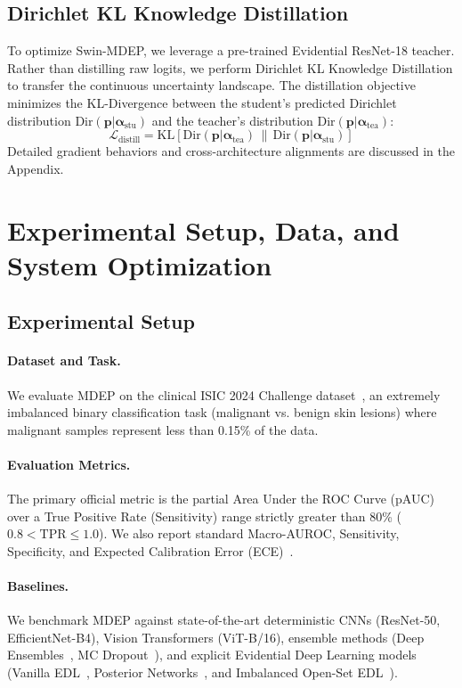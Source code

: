 \documentclass[letterpaper]{article} %
\begin{document}
\subsection{Dirichlet KL Knowledge Distillation}\label{subsec:distillation}
To optimize Swin-MDEP, we leverage a pre-trained Evidential ResNet-18 teacher. Rather than distilling raw logits, we perform Dirichlet KL Knowledge Distillation to transfer the continuous uncertainty landscape. The distillation objective minimizes the KL-Divergence between the student's predicted Dirichlet distribution $\text{Dir}(\bm{p} | \bm{\alpha}_{\text{stu}})$ and the teacher's distribution $\text{Dir}(\bm{p} | \bm{\alpha}_{\text{tea}})$:
\begin{equation}
    \mathcal{L}_{\text{distill}} = \text{KL} \left[ \text{Dir}(\bm{p} | \bm{\alpha}_{\text{tea}}) \,\|\, \text{Dir}(\bm{p} | \bm{\alpha}_{\text{stu}}) \right]
\end{equation}
Detailed gradient behaviors and cross-architecture alignments are discussed in the Appendix.

\section{Experimental Setup, Data, and System Optimization}\label{sec:experiment}

\subsection{Experimental Setup}
\paragraph{Dataset and Task.} We evaluate MDEP on the clinical ISIC 2024 Challenge dataset~\cite{isic2024}, an extremely imbalanced binary classification task (malignant vs. benign skin lesions) where malignant samples represent less than 0.15\% of the data. 

\paragraph{Evaluation Metrics.} The primary official metric is the partial Area Under the ROC Curve (pAUC) over a True Positive Rate (Sensitivity) range strictly greater than 80\% ($0.8 < \text{TPR} \le 1.0$). We also report standard Macro-AUROC, Sensitivity, Specificity, and Expected Calibration Error (ECE)~\cite{naeini2015obtaining}.

\paragraph{Baselines.} We benchmark MDEP against state-of-the-art deterministic CNNs (ResNet-50, EfficientNet-B4), Vision Transformers (ViT-B/16), ensemble methods (Deep Ensembles~\cite{lakshminarayanan2017simple}, MC Dropout~\cite{gal2016dropout}), and explicit Evidential Deep Learning models (Vanilla EDL~\cite{sensoy2018evidential}, Posterior Networks~\cite{charpentier2020posterior}, and Imbalanced Open-Set EDL~\cite{pandey2023learn}).
\end{document}
